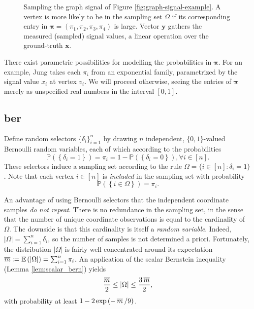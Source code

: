 \begin{figure}[H]
    \centering
    
    \caption[Sampling the graph signal]{Sampling the graph signal of Figure \ref{fig:graph-signal-example}. A vertex is more likely to be in the sampling set $\Omega$ if its corresponding entry in $\bm{\pi} = \left( \pi_1, \pi_2, \pi_3, \pi_4 \right)$ is large. Vector $\mathbf{y}$ gathers the measured (sampled) signal values, a linear operation over the ground-truth $\mathbf{x}$.}
    \label{fig:sampling-graph-signal-example}
\end{figure}

There exist parametric possibilities for modelling the probabilities in $\bm{\pi}$. For an example, Jung \cite{jung2018} takes each $\pi_i$ from an exponential family, parametrized by the signal value $x_i$ at vertex $v_i$. We will proceed otherwise, seeing the entries of $\bm{\pi}$ merely as unspecified real numbers in the interval $[0,1]$.


\subsection{\texorpdfstring{\acrfull{ber}}{Bernoulli Sampling Model}}\label{sec:ber}

Define random selectors $\{ \delta_i \}_{i=1}^n$ by drawing $n$ independent, $\{0, 1\}$-valued Bernoulli random variables, each of which according to the probabilities
\begin{equation}
    \mathbb{P} \left ( \left \{  \delta_i = 1 \right \}\right ) = \pi_i = 1 - \mathbb{P} \left ( \left \{  \delta_i = 0 \right \}\right ), \forall i \in [n].
\end{equation}
These selectors induce a sampling set according to the rule $\Omega = \{ i \in [n] : \delta_i = 1\}$. Note that each vertex $i \in [n]$ is \emph{included} in the sampling set with probability
\begin{equation*}
    \mathbb{P} \left ( \left \{  i \in \Omega \right \}\right ) = \pi_i.
\end{equation*}

An advantage of using Bernoulli selectors that the independent coordinate samples \emph{do not repeat}. There is no redundance in the sampling set, in the sense that the number of unique coordinate observations is equal to the cardinality of $\Omega$. The downside is that this cardinality is itself a \emph{random variable}. Indeed, $|\Omega| = \sum_{i=1}^{n} \delta_i$, so the number of samples is not determined a priori. Fortunately, the distribution $|\Omega|$ is fairly well concentrated around its expectation $\mathop{\overline{m}} := \mathbb{E} \left ( |\Omega| \right ) = \sum_{i=1}^{n} \pi_i$. An application of the scalar Bernstein inequality (Lemma \ref{lem:scalar_bern}) yields
\begin{equation}
    \frac{\mathop{\overline{m}}}{2} \leq |\Omega| \leq \frac{3 \mathop{\overline{m}}}{2},
\end{equation}
with probability at least $1 - 2 \exp \left ( -  \mathop{\overline{m}} / 9 \right )$.

